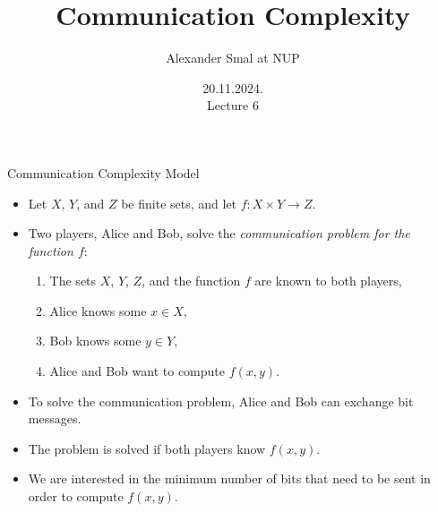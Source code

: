 \documentclass[
aspectratio=169]{beamer}
\title{Communication Complexity}
\author{Alexander Smal at NUP}
\date{20.11.2024.\\ Lecture 6}
\newcommand{\pitem}{\pause\item}
\begin{document}
\begin{frame}[plain]
    \maketitle
\end{frame}

\begin{frame}{Communication Complexity Model}
    \begin{itemize}
    \item Let $X$, $Y$, and $Z$ be finite sets, and let $f: X \times Y \to Z$.

    \pitem Two players, Alice and Bob, solve the \emph{communication problem for the function $f$}:
    \begin{enumerate}
        \item The sets $X$, $Y$, $Z$, and the function $f$ are known to both players,
        \item Alice knows some $x \in X$,
        \item Bob knows some $y \in Y$,
        \item Alice and Bob want to compute $f(x,y)$.
    \end{enumerate}

    \pitem To solve the communication problem, Alice and Bob can exchange bit messages.

    \pitem The problem is solved if both players know $f(x,y)$.

    \pitem We are interested in the minimum number of bits that need to be sent in order to compute $f(x,y)$.
    \end{itemize}

\end{frame}


\end{document}
